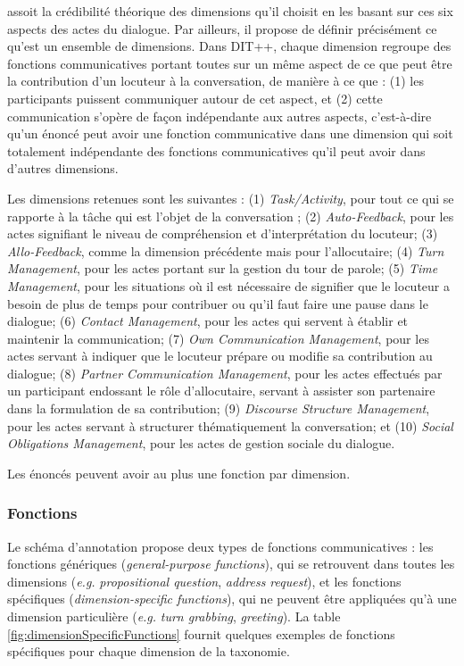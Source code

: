 \documentclass[10pt,a4paper,twoside]{article}
\begin{document}
\citeauthor{bunt2009dit++} assoit la crédibilité théorique des dimensions qu'il choisit en les basant sur ces six aspects des actes du dialogue. Par ailleurs, il propose de définir précisément ce qu'est un ensemble de dimensions. Dans DIT++, chaque dimension regroupe des fonctions communicatives portant toutes sur un même aspect de ce que peut être la contribution d'un locuteur à la conversation, de manière à ce que : (1) les participants puissent communiquer autour de cet aspect, et (2) cette communication s'opère de façon indépendante aux autres aspects, c'est-à-dire qu'un énoncé peut avoir une fonction communicative dans une dimension qui soit totalement indépendante des fonctions communicatives qu'il peut avoir dans d'autres dimensions.

Les dimensions retenues sont les suivantes : (1) \textit{Task/Activity}, pour tout ce qui se rapporte à la tâche qui est l'objet de la conversation ; (2) \textit{Auto-Feedback}, pour les actes signifiant le niveau de compréhension et d'interprétation du locuteur; (3) \textit{Allo-Feedback}, comme la dimension précédente mais pour l'allocutaire; (4) \textit{Turn Management}, pour les actes portant sur la gestion du tour de parole; (5) \textit{Time Management}, pour les situations où il est nécessaire de signifier que le locuteur a besoin de plus de temps pour contribuer ou qu'il faut faire une pause dans le dialogue; (6) \textit{Contact Management}, pour les actes qui servent à établir et maintenir la communication; (7) \textit{Own Communication Management}, pour les actes servant à indiquer que le locuteur prépare ou modifie sa contribution au dialogue; (8) \textit{Partner Communication Management}, pour les actes effectués par un participant endossant le rôle d'allocutaire, servant à assister son partenaire dans la formulation de sa contribution; (9) \textit{Discourse Structure Management}, pour les actes servant à structurer thématiquement la conversation; et (10) \textit{Social Obligations Management}, pour les actes de gestion sociale du dialogue.

Les énoncés peuvent avoir au plus une fonction par dimension.

\subsubsection{Fonctions}

Le schéma d'annotation propose deux types de fonctions communicatives : les fonctions génériques (\textit{general-purpose functions}), qui se retrouvent dans toutes les dimensions (\textit{e.g.} \textit{propositional question}, \textit{address request}), et les fonctions spécifiques (\textit{dimension-specific functions}), qui ne peuvent être appliquées qu'à une dimension particulière (\textit{e.g.} \textit{turn grabbing}, \textit{greeting}). La table \ref{fig:dimensionSpecificFunctions} fournit quelques exemples de fonctions spécifiques pour chaque dimension de la taxonomie.
\end{document}
